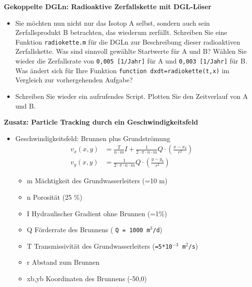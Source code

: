   \secMexercise
      \begin{frame}
          \frameMexercise
          \begin{exercise}
              \sloppy
              \textbf{Gekoppelte DGLn: Radioaktive Zerfallskette mit DGL-Löser}
              \begin{itemize}
                \item Sie möchten nun nicht nur das Isotop A selbst, sondern auch sein Zerfallsprodukt B betrachten, das wiederum zerfällt. Schreiben Sie eine Funktion \texttt{radiokette.m} für die DGLn zur Beschreibung dieser radioaktiven Zerfallskette. Was sind sinnvoll gewählte Startwerte für A und B? Wählen Sie wieder die Zerfallsrate von \texttt{0,005  [1/Jahr]} für A und \texttt{0,003  [1/Jahr]} für B. Was ändert sich für Ihre Funktion \texttt{function dxdt=radiokette(t,x)} im Vergleich zur vorhergehenden Aufgabe?
                \item Schreiben Sie wieder ein aufrufendes Script. Plotten Sie den Zeitverlauf von A und B.
              \end{itemize}
          \end{exercise}
      \end{frame}

  \secMexercise
      \begin{frame}
          \frameMexercise
          \begin{exercise}
              \sloppy
              \textbf{Zusatz: Particle Tracking durch ein Geschwindigkeitsfeld}
              \begin{itemize}
               \item Geschwindigkeitsfeld: Brunnen plus Grundströmung
                 \begin{align*}
                     v_{x}(x,y) &= \frac{T}{n \cdot m}I+\frac{1}{2 \cdot \pi \cdot n \cdot m}Q \cdot \left( \frac{x-x_{b}}{r^{2}} \right) \\
         		     v_{y}(x,y) &= \frac{1}{2 \cdot \pi \cdot n \cdot m}Q \cdot \left( \frac{y-y_{b}}{r^{2}} \right)
         		 \end{align*}
          
                  \begin{itemize}
					\item m	Mächtigkeit des Grundwasserleiters (=10 m)
					\item n	Porosität (25 \%)
					\item I	Hydraulischer Gradient ohne Brunnen (=1\%)
					\item Q	Förderrate des Brunnens ( \texttt{Q = 1000 m$^3$/d})
					\item T	Transmissivität des Grundwasserleiters (\texttt{=5*10$^{-3}$ m$^2$/s})
					\item r	Abstand zum Brunnen
					\item xb,yb Koordinaten des Brunnens (-50,0)
				  \end{itemize}

                \end{itemize}
          \end{exercise}
      \end{frame}
      
